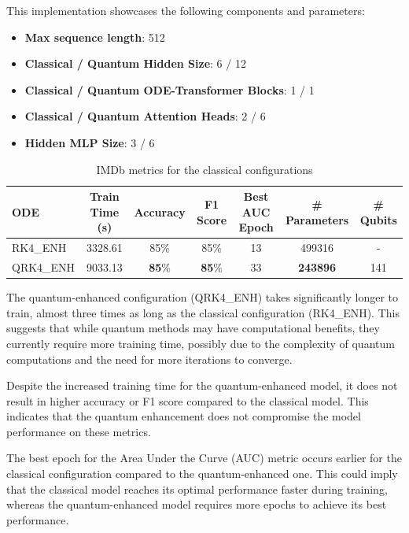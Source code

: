 \documentclass[12pt,a4paper]{report}
\begin{document}
This implementation showcases the following components and parameters:
\begin{itemize}
  \item \textbf{Max sequence length}: 512
  \item \textbf{Classical / Quantum Hidden Size}: 6 / 12
  \item \textbf{Classical / Quantum ODE-Transformer Blocks}: 1 / 1
  \item \textbf{Classical / Quantum Attention Heads}: 2 / 6
  \item \textbf{Hidden MLP Size}: 3 / 6
\end{itemize}

\begin{table}[th]\small\linespread{1}
  \label{tab:classical_CIFAR_1}
  \centering
  \begin{tabular}{|l|c|c|c|c|c|c|}
    \hline
    \textbf{ODE} & \textbf{Train Time (s)} & \textbf{Accuracy} & \textbf{F1 Score} & \textbf{Best AUC Epoch} & \textbf{\# Parameters} & \textbf{\# Qubits} \\
    \hline
    RK4\_ENH     & 3328.61                 & 85\%              & 85\%              & 13                      & 499316                 & -                  \\
    QRK4\_ENH    & 9033.13                 & \textbf{85}\%     & \textbf{85}\%     & 33                      & \textbf{243896}        & 141                \\
    \hline
  \end{tabular}
  \caption{IMDb metrics for the classical configurations}
\end{table}

The quantum-enhanced configuration (QRK4\_ENH) takes significantly longer to train, almost three times as long as the classical configuration (RK4\_ENH). This suggests that while quantum methods may have computational benefits, they currently require more training time, possibly due to the complexity of quantum computations and the need for more iterations to converge.

Despite the increased training time for the quantum-enhanced model, it does not result in higher accuracy or F1 score compared to the classical model. This indicates that the quantum enhancement does not compromise the model performance on these metrics.

The best epoch for the Area Under the Curve (AUC) metric occurs earlier for the classical configuration compared to the quantum-enhanced one. This could imply that the classical model reaches its optimal performance faster during training, whereas the quantum-enhanced model requires more epochs to achieve its best performance.
\end{document}
